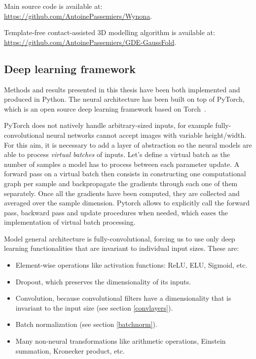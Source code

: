    Main source code is available at: \,
    \href{https://github.com/AntoinePassemiers/Wynona}{https://github.com/AntoinePassemiers/Wynona}.

    Template-free contact-assisted 3D modelling algorithm is available at: \, \\
    \href{https://github.com/AntoinePassemiers/GDE-GaussFold}{https://github.com/AntoinePassemiers/GDE-GaussFold}.

  \subsection{Deep learning framework}

    Methods and results presented in this thesis have been both implemented and produced in
    Python. The neural architecture has been built on top of PyTorch,
    which is an open source deep learning framework based on Torch~\cite{torch}.

    PyTorch does not natively handle arbitrary-sized inputs, for example fully-convolutional
    neural networks cannot accept images with variable height/width.
    For this aim, it is necessary to add a layer of abstraction so the neural models are
    able to process \textit{virtual batches} of inputs. Let's define a virtual batch as the number
    of samples a model has to process between each parameter update.
    A forward pass on a virtual batch then consists in constructing one computational graph
    per sample and backpropagate the gradients through each one of them separately.
    Once all the gradients have been computed, they are collected and averaged over the sample
    dimension. Pytorch allows to explicitly call the forward pass, backward pass and update
    procedures when needed, which eases the implementation of virtual batch processing.

    Model general architecture is fully-convolutional, forcing us to use only deep learning
    functionalities that are invariant to individual input sizes. These are:

    \begin{itemize}
      \item Element-wise operations like activation functions: ReLU, ELU, Sigmoid, etc.
      \item Dropout, which preserves the dimensionality of its inputs.
      \item Convolution, because convolutional filters have a dimensionality that is
      invariant to the input size (see section \ref{convlayers}).
      \item Batch normalization (see section \ref{batchnorm}).
      \item Many non-neural transformations like arithmetic operations, Einstein
      summation, Kronecker product, etc.
    \end{itemize}

